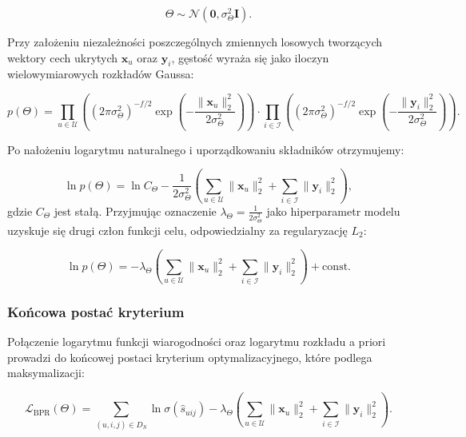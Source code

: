\begin{equation}
    \Theta \sim \mathcal{N}(\mathbf{0},\sigma_\Theta^2\mathbf{I}).
\end{equation}

Przy założeniu niezależności poszczególnych zmiennych losowych tworzących wektory cech ukrytych $\mathbf{x}_u$ oraz $\mathbf{y}_i$, gęstość wyraża się jako iloczyn wielowymiarowych rozkładów Gaussa:

\begin{equation}
    p(\Theta) = \prod_{u \in \mathcal{U}} \left( \left(2\pi \sigma_\Theta^2\right)^{-f/2} \exp\left( -\frac{\|\mathbf{x}_u\|_2^2}{2\sigma_\Theta^2} \right) \right) \cdot \prod_{i \in \mathcal{I}} \left( \left(2\pi \sigma_\Theta^2\right)^{-f/2} \exp\left( -\frac{\|\mathbf{y}_i\|_2^2}{2\sigma_\Theta^2} \right) \right).
\end{equation}

Po nałożeniu logarytmu naturalnego i uporządkowaniu składników otrzymujemy:

\begin{equation}
    \ln p(\Theta) = \ln C_\Theta - \frac{1}{2\sigma_\Theta^2} \left( \sum_{u \in \mathcal{U}} \|\mathbf{x}_u\|_2^2 + \sum_{i \in \mathcal{I}} \|\mathbf{y}_i\|_2^2 \right),
\end{equation}
gdzie $C_\Theta$ jest stałą. Przyjmując oznaczenie $\lambda_\Theta = \frac{1}{2\sigma_\Theta^2}$ jako hiperparametr modelu uzyskuje się drugi człon funkcji celu, odpowiedzialny za regularyzację $L_2$:

\begin{equation}
    \ln p(\Theta) = -\lambda_\Theta \left( \sum_{u \in \mathcal{U}} \|\mathbf{x}_u\|_2^2 + \sum_{i \in \mathcal{I}} \|\mathbf{y}_i\|_2^2 \right) + \mathrm{const}.
\end{equation}

\subsubsection{Końcowa postać kryterium}

Połączenie logarytmu funkcji wiarogodności oraz logarytmu rozkładu a priori prowadzi do końcowej postaci kryterium optymalizacyjnego, które podlega maksymalizacji:

\begin{equation}
    \mathcal{L}_{\text{BPR}}(\Theta) = \sum_{(u, i, j) \in D_S} \ln \sigma(\hat{s}_{uij}) - \lambda_\Theta \left( \sum_{u \in \mathcal{U}} \|\mathbf{x}_u\|_2^2 + \sum_{i \in \mathcal{I}} \|\mathbf{y}_i\|_2^2 \right).
\end{equation}

